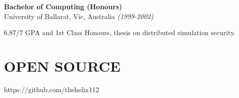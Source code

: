 \documentclass[margin]{res}
\begin{document}
\begin{resume}
{\bf Bachelor of Computing (Honours)} \\
University of Ballarat, Vic, Australia {\em (1999-2002)}
\begin{list}{}{\leftmargin=1.5em \topsep=5pt \partopsep=0pt \parsep=2.5pt}
  \item 6.87/7 GPA and 1st Class Honours, thesis on distributed simulation security.
\end{list}


\section{OPEN SOURCE}
https://github.com/thehelix112









\end{resume}
\end{document}
